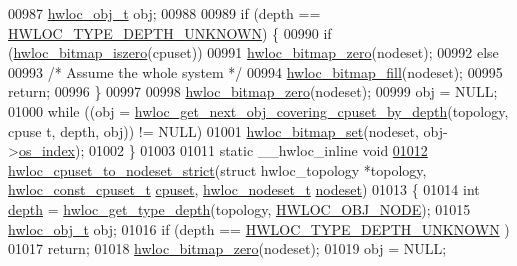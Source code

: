 \begin{DoxyCode}
00987         \hyperlink{a00016}{hwloc_obj_t} obj;
00988 
00989         \textcolor{keywordflow}{if} (depth == \hyperlink{a00046_ggaf4e663cf42bbe20756b849c6293ef575a0565ab92ab72cb0cec91e23003294aad}{HWLOC_TYPE_DEPTH_UNKNOWN}) \{
00990                  \textcolor{keywordflow}{if} (\hyperlink{a00065_gaa94fed35d2a598bc4a8657b6955b7bf5}{hwloc_bitmap_iszero}(cpuset))
00991                         \hyperlink{a00065_ga6c540b9fe63b8223b6aba46d56dd63b8}{hwloc_bitmap_zero}(nodeset);
00992                 \textcolor{keywordflow}{else}
00993                         \textcolor{comment}{/* Assume the whole system */}
00994                         \hyperlink{a00065_ga52456f7ef79d68e610cb65e3f7ffafad}{hwloc_bitmap_fill}(nodeset);
00995                 \textcolor{keywordflow}{return};
00996         \}
00997 
00998         \hyperlink{a00065_ga6c540b9fe63b8223b6aba46d56dd63b8}{hwloc_bitmap_zero}(nodeset);
00999         obj = NULL;
01000         \textcolor{keywordflow}{while} ((obj = \hyperlink{a00056_ga2f9a4ec15e9cfae8c21501257a51ce5b}{hwloc_get_next_obj_covering_cpuset_by_depth}(topology, cpuse
      t, depth, obj)) != NULL)
01001                 \hyperlink{a00065_ga497556af0cc34f109ae0277999c074d3}{hwloc_bitmap_set}(nodeset, obj->\hyperlink{a00016_a61a7a80a68eaccbaaa28269e678c81a9}{os_index});
01002 \}
01003 
01011 \textcolor{keyword}{static} \_\_hwloc\_inline \textcolor{keywordtype}{void}
\hypertarget{a00031_source_l01012}{}\hyperlink{a00062_ga9162785e39d7c697f76f99524c4a2fb4}{01012} \hyperlink{a00062_ga9162785e39d7c697f76f99524c4a2fb4}{hwloc_cpuset_to_nodeset_strict}(\textcolor{keyword}{struct} hwloc\_topology *topology, 
      \hyperlink{a00040_ga1f784433e9b606261f62d1134f6a3b25}{hwloc_const_cpuset_t} \hyperlink{a00016_a67925e0f2c47f50408fbdb9bddd0790f}{cpuset}, \hyperlink{a00040_ga37e35730fa7e775b5bb0afe893d6d508}{hwloc_nodeset_t} \hyperlink{a00016_a08f0d0e16c619a6e653526cbee4ffea3}{nodeset})
01013 \{
01014         \textcolor{keywordtype}{int} \hyperlink{a00016_a9d82690370275d42d652eccdea5d3ee5}{depth} = \hyperlink{a00046_gaea7c64dd59467f5201ba87712710b14d}{hwloc_get_type_depth}(topology, \hyperlink{a00041_ggacd37bb612667dc437d66bfb175a8dc55aaf0964881117bdedf1a5e9332cd120dd}{HWLOC_OBJ_NODE});
01015         \hyperlink{a00016}{hwloc_obj_t} obj;
01016         \textcolor{keywordflow}{if} (depth == \hyperlink{a00046_ggaf4e663cf42bbe20756b849c6293ef575a0565ab92ab72cb0cec91e23003294aad}{HWLOC_TYPE_DEPTH_UNKNOWN} )
01017                 \textcolor{keywordflow}{return};
01018         \hyperlink{a00065_ga6c540b9fe63b8223b6aba46d56dd63b8}{hwloc_bitmap_zero}(nodeset);
01019         obj = NULL;

\end{DoxyCode}
